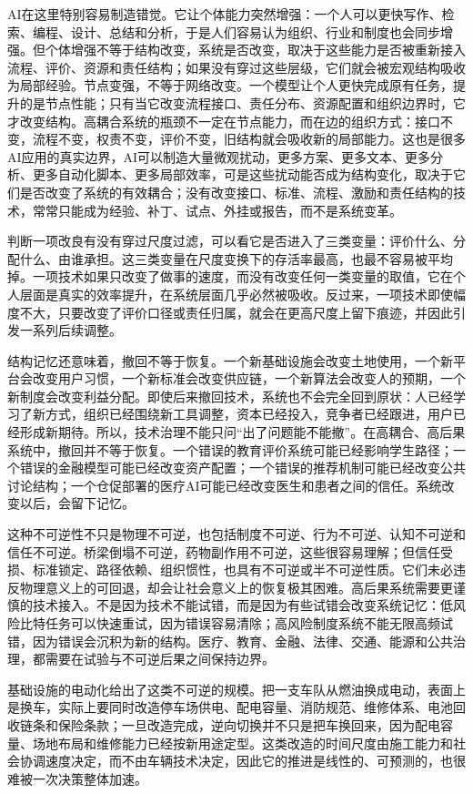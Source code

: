 AI在这里特别容易制造错觉。它让个体能力突然增强：一个人可以更快写作、检索、编程、设计、总结和分析，于是人们容易认为组织、行业和制度也会同步增强。但个体增强不等于结构改变，系统是否改变，取决于这些能力是否被重新接入流程、评价、资源和责任结构；如果没有穿过这些层级，它们就会被宏观结构吸收为局部经验。节点变强，不等于网络改变。一个模型让个人更快完成原有任务，提升的是节点性能；只有当它改变流程接口、责任分布、资源配置和组织边界时，它才改变结构。高耦合系统的瓶颈不一定在节点能力，而在边的组织方式：接口不变，流程不变，权责不变，评价不变，旧结构就会吸收新的局部能力。这也是很多AI应用的真实边界，AI可以制造大量微观扰动，更多方案、更多文本、更多分析、更多自动化脚本、更多局部效率，可是这些扰动能否成为结构变化，取决于它们是否改变了系统的有效耦合；没有改变接口、标准、流程、激励和责任结构的技术，常常只能成为经验、补丁、试点、外挂或报告，而不是系统变革。

判断一项改良有没有穿过尺度过滤，可以看它是否进入了三类变量：评价什么、分配什么、由谁承担。这三类变量在尺度变换下的存活率最高，也最不容易被平均掉。一项技术如果只改变了做事的速度，而没有改变任何一类变量的取值，它在个人层面是真实的效率提升，在系统层面几乎必然被吸收。反过来，一项技术即使幅度不大，只要改变了评价口径或责任归属，就会在更高尺度上留下痕迹，并因此引发一系列后续调整。


结构记忆还意味着，撤回不等于恢复。一个新基础设施会改变土地使用，一个新平台会改变用户习惯，一个新标准会改变供应链，一个新算法会改变人的预期，一个新制度会改变利益分配。即使后来撤回技术，系统也不会完全回到原状：人已经学习了新方式，组织已经围绕新工具调整，资本已经投入，竞争者已经跟进，用户已经形成新期待。所以，技术治理不能只问“出了问题能不能撤”。在高耦合、高后果系统中，撤回并不等于恢复。一个错误的教育评价系统可能已经影响学生路径；一个错误的金融模型可能已经改变资产配置；一个错误的推荐机制可能已经改变公共讨论结构；一个仓促部署的医疗AI可能已经改变医生和患者之间的信任。系统改变以后，会留下记忆。

这种不可逆性不只是物理不可逆，也包括制度不可逆、行为不可逆、认知不可逆和信任不可逆。桥梁倒塌不可逆，药物副作用不可逆，这些很容易理解；但信任受损、标准锁定、路径依赖、组织惯性，也具有不可逆或半不可逆性质。它们未必违反物理意义上的可回退，却会让社会意义上的恢复极其困难。高后果系统需要更谨慎的技术接入。不是因为技术不能试错，而是因为有些试错会改变系统记忆：低风险比特任务可以快速重试，因为错误容易清除；高风险制度系统不能无限高频试错，因为错误会沉积为新的结构。医疗、教育、金融、法律、交通、能源和公共治理，都需要在试验与不可逆后果之间保持边界。

基础设施的电动化给出了这类不可逆的规模。把一支车队从燃油换成电动，表面上是换车，实际上要同时改造停车场供电、配电容量、消防规范、维修体系、电池回收链条和保险条款；一旦改造完成，逆向切换并不只是把车换回来，因为配电容量、场地布局和维修能力已经按新用途定型。这类改造的时间尺度由施工能力和社会协调速度决定，而不由车辆技术决定，因此它的推进是线性的、可预测的，也很难被一次决策整体加速。

